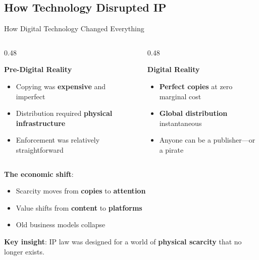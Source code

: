﻿\documentclass[aspectratio=169,11pt]{beamer}
\begin{document}
\subsection{How Technology Disrupted IP}

\begin{frame}{How Digital Technology Changed Everything}
\begin{columns}[T]
\begin{column}{0.48\textwidth}
\begin{block}{\textbf{Pre-Digital Reality}}
\begin{itemize}
    \item Copying was \textbf{expensive} and imperfect
    \item Distribution required \textbf{physical infrastructure}
    \item Enforcement was relatively straightforward
\end{itemize}
\end{block}
\end{column}

\begin{column}{0.48\textwidth}
\begin{block}{\textbf{Digital Reality}}
\begin{itemize}
    \item \textbf{Perfect copies} at zero marginal cost
    \item \textbf{Global distribution} instantaneous
    \item Anyone can be a publisher---or a pirate
\end{itemize}
\end{block}
\end{column}
\end{columns}

\vspace{0.4cm}
\textbf{The economic shift}:
\begin{itemize}
    \item Scarcity moves from \textbf{copies} to \textbf{attention}
    \item Value shifts from \textbf{content} to \textbf{platforms}
    \item Old business models collapse
\end{itemize}

\vspace{0.2cm}
\textbf{Key insight}: IP law was designed for a world of \textbf{physical scarcity} that no longer exists.
\end{frame}
\end{document}
